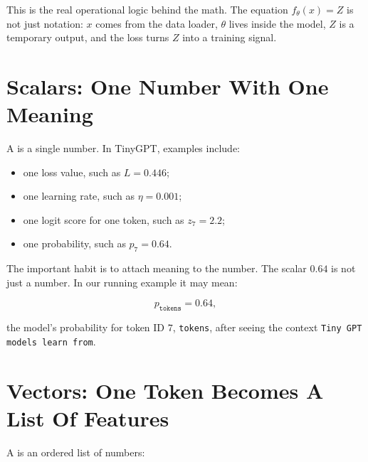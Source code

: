 This is the real operational logic behind the math. The equation \(f_\theta(x)=Z\) is not just notation: \(x\) comes from the data loader, \(\theta\) lives inside the model, \(Z\) is a temporary output, and the loss turns \(Z\) into a training signal.

\section{Scalars: One Number With One Meaning}

A  is a single number. In TinyGPT, examples include:

\begin{itemize}
  \item one loss value, such as \(L=0.446\);
  \item one learning rate, such as \(\eta=0.001\);
  \item one logit score for one token, such as \(z_7=2.2\);
  \item one probability, such as \(p_7=0.64\).
\end{itemize}

The important habit is to attach meaning to the number. The scalar \(0.64\) is not just a number. In our running example it may mean:

\[
p_{\texttt{tokens}} = 0.64,
\]

the model's probability for token ID \(7\), \texttt{tokens}, after seeing the context \texttt{Tiny GPT models learn from}.

\begin{center}
\end{center}

\section{Vectors: One Token Becomes A List Of Features}

A  is an ordered list of numbers:


